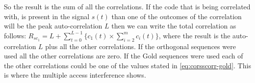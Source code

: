 %


So the result is the sum of all the correlations. 
If the code that is being correlated with, is present in the signal $s(t)$ than one of the outcomes of the correlation will be the peak auto-correlation $L$ then we can write the total correlation as follows: $R_{sc_{1}} = L + \displaystyle\sum_{t = 0} ^ {L - 1} \Bigg\{ c_1(t) \times  \displaystyle\sum_{i = 2} ^ {m} c_i(t) \Bigg\} $, where the result is the auto-correlation $L$ plus all the other correlations.
If the orthogonal sequences were used all the other correlations are zero.
If the Gold sequences were used each of the other correlations could be one of the values stated in \autoref{eq:corsscorr-gold}.
This is where the multiple access interference shows.







